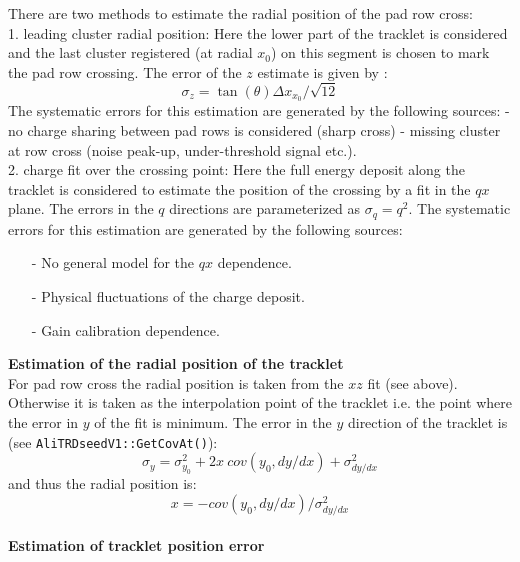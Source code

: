 \documentclass{alicetdr}
\begin{document}
There are two methods to estimate the radial position of the pad row cross:\\
1. leading cluster radial position: Here the lower part of the tracklet is 
considered and the last cluster registered (at radial $x_{0}$) on this segment 
is chosen to mark the pad row crossing. The error of the $z$ estimate is given by :
\begin{equation}
\sigma_{z} = \tan(\theta) \Delta x_{x_{0}}/\sqrt{12}
\end{equation}
The systematic errors for this estimation are generated by the following sources:
  - no charge sharing between pad rows is considered (sharp cross)
  - missing cluster at row cross (noise peak-up, under-threshold signal etc.).
\\
2. charge fit over the crossing point: Here the full energy deposit along 
the tracklet is considered to estimate the position of the crossing by a fit 
in the $qx$ plane. The errors in the $q$ directions are parameterized as 
$\sigma_q = q^2$. The systematic errors for this estimation are generated by the 
following sources:
\begin{itemize}
\item[-] No general model for the $qx$ dependence.
\item[-] Physical fluctuations of the charge deposit.
\item[-] Gain calibration dependence.
\end{itemize}

\noindent
{\bf Estimation of the radial position of the tracklet}\\

For pad row cross the radial position is taken from the $xz$ fit (see above). 
Otherwise it is taken as the interpolation point of the tracklet i.e. the 
point where the error in $y$ of the fit is minimum. The error in the $y$ 
direction of the tracklet is (see {\tt AliTRDseedV1::GetCovAt()}):
\begin{equation}
\sigma_{y} = \sigma^{2}_{y_{0}} + 2x\:cov(y_{0}, dy/dx) + \sigma^{2}_{dy/dx}
\end{equation}
and thus the radial position is:
\begin{equation}
x = - cov(y_{0}, dy/dx)/\sigma^{2}_{dy/dx}
\end{equation}
\\

\noindent
{\bf Estimation of tracklet position error}\\ 
\end{document}
